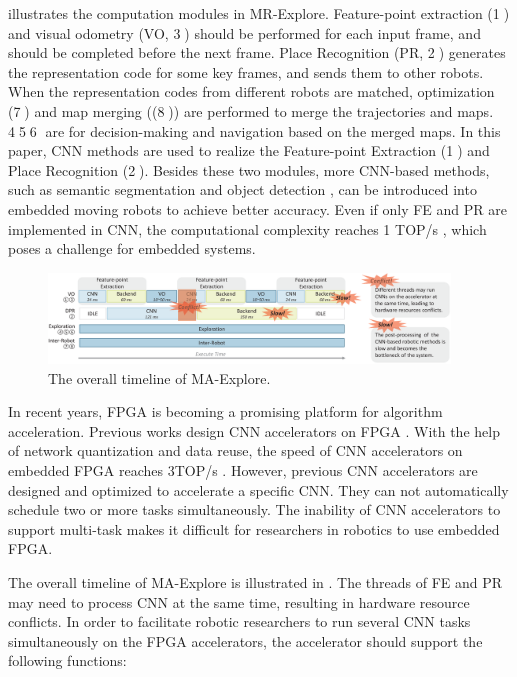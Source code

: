  illustrates the computation modules in MR-Explore.
Feature-point extraction (\textcircled{1}) and visual odometry (VO, \textcircled{3}) should be performed for each input frame, and should be completed before the next frame. 
Place Recognition (PR, \textcircled{2}) generates the representation code for some key frames, and sends them to other robots. 
When the  representation codes from different robots are matched, optimization (\textcircled{7}) and map merging ((\textcircled{8})) are performed to merge the trajectories and maps. \textcircled{4}\textcircled{5}\textcircled{6} are for decision-making and navigation based on the merged maps. 
In this paper, CNN methods are used to realize the Feature-point Extraction (\textcircled{1}) and  Place Recognition (\textcircled{2}).
Besides these two modules, more CNN-based methods, such as semantic segmentation \cite{long2015fully} and object detection \cite{ren2015faster}, can be introduced into embedded moving robots to achieve better accuracy.
Even if only FE and PR are implemented in CNN, the computational complexity reaches 1 TOP/s , which poses a challenge for embedded systems.


\begin{figure}[t]
    \centering
	\includegraphics[width=0.95\textwidth]{fig/overalltime.eps} 	
    \caption{
    The overall timeline of MA-Explore.
    }
	\label{fig:overalltime}
\end{figure}


In recent years, FPGA is becoming a promising platform for algorithm acceleration. Previous works design CNN accelerators on FPGA \cite{yu2018instruction,li_high_2016,qiu2016going,lu_evaluating_2017}. With the help of network quantization and data reuse, the speed of CNN accelerators on embedded FPGA reaches 3TOP/s \cite{lu_evaluating_2017}.
However, previous CNN accelerators are designed and optimized to accelerate a specific CNN. They can not automatically schedule two or more tasks simultaneously. 
The inability of CNN accelerators to support multi-task makes it difficult for researchers in robotics to use embedded FPGA.



The overall timeline of MA-Explore is illustrated in . 
The threads of FE and PR may need to process CNN at the same time, resulting in hardware resource conflicts. 
In order to facilitate robotic researchers to run several CNN tasks simultaneously on the FPGA accelerators, the accelerator should support the following functions:

